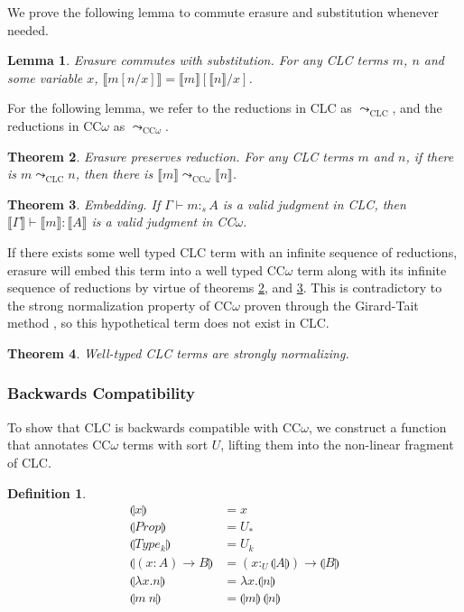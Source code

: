 \documentclass[sigplan,screen]{acmart}
\newtheorem{theorem}{Theorem}[section]
\newtheorem{lemma}[theorem]{Lemma}
\theoremstyle{definition}
\newtheorem{definition}{Definition}[section]
\newcommand{\utype}{:_{\scriptscriptstyle U}}
\newcommand{\stype}[1]{:_#1}
\newcommand{\step}{\leadsto}
\newcommand{\erase}[1]{\llbracket #1 \rrbracket}
\newcommand{\lift}[1]{\llparenthesis #1 \rrparenthesis}
\begin{document}
  We prove the following lemma to commute erasure and substitution whenever needed.
  \begin{lemma} 
    Erasure commutes with substitution. For any CLC terms $m$, $n$ and some variable $x$, $\erase{m[n/x]} = \erase{m}[\erase{n}/x]$. 
  \end{lemma}

  For the following lemma, we refer to the reductions in CLC as $\step_{\scriptscriptstyle \text{CLC}}$, and the reductions in CC$\omega$ as $\step_{\scriptscriptstyle \text{CC$\omega$}}$.
  \begin{theorem} \label{preserve} 
    Erasure preserves reduction. For any CLC terms $m$ and $n$, if there is $m \step_{\scriptscriptstyle \text{CLC}} n$, then there is $\erase{m} \step_{\scriptscriptstyle \text{CC$\omega$}} \erase{n}$.
  \end{theorem}

  \begin{theorem} \label{embedding} 
    Embedding. If $\Gamma \vdash m \stype{s} A$ is a valid judgment in CLC, then $\erase{\Gamma} \vdash \erase{m} : \erase{A}$ is a valid judgment in CC$\omega$.
  \end{theorem}

  If there exists some well typed CLC term with an infinite sequence of reductions, erasure will embed this term into a well typed CC$\omega$ term along with its infinite sequence of reductions by virtue of theorems \ref{preserve}, and \ref{embedding}. This is contradictory to the strong normalization property of CC$\omega$ proven through the Girard-Tait method \cite{ecc}, so this hypothetical term does not exist in CLC.

  \begin{theorem}
    Well-typed CLC terms are strongly normalizing.
  \end{theorem}

  \subsubsection{Backwards Compatibility}
  To show that CLC is backwards compatible with CC$\omega$, we construct a function that annotates CC$\omega$ terms with sort $U$, lifting them into the non-linear fragment of CLC.

  \begin{definition}
    \begin{align*}
      \lift{x} &= x \\
      \lift{Prop} &= U_* \\
      \lift{Type_k} &= U_k \\
      \lift{(x : A) \rightarrow B} &= (x \utype \lift{A}) \rightarrow \lift{B} \\
      \lift{\lambda x.n} &= \lambda x.\lift{n} \\
      \lift{m\ n} &= \lift{m}\ \lift{n}
    \end{align*}
  \end{definition}
\end{document}

